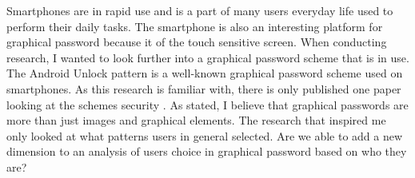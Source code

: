   Smartphones are in rapid use and is a part of many users everyday life used to perform their daily tasks. The smartphone is also an interesting platform for graphical password because it of the touch sensitive screen. When conducting research, I wanted to look further into a graphical password scheme that is in use. The Android Unlock pattern is a well-known graphical password scheme used on smartphones. As this research is familiar with, there is only published one paper looking at the schemes security \cite{Uellenbeck}. As stated, I believe that graphical passwords are more than just images and graphical elements. The research that inspired me only looked at what patterns users in general selected. Are we able to add a new dimension to an analysis of users choice in graphical password based on who they are? 



